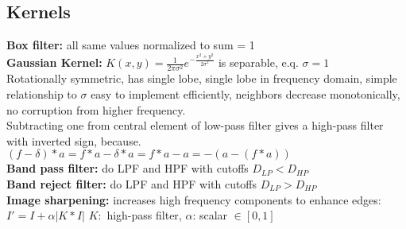 \subsection*{Kernels}
\textbf{Box filter:} all same values normalized to sum = 1\\
\textbf{Gaussian Kernel:} $K(x, y) = \frac{1}{2\pi \sigma^{2}} e^{-\frac{x^{2} + y^{2}}{2\sigma^{2}}}$ is separable, e.q. $\sigma = 1$\\
Rotationally symmetric, has single lobe, single lobe in frequency domain, simple relationship to $\sigma$ easy to implement efficiently, neighbors decrease monotonically, no corruption from higher frequency. \\
Subtracting one from central element of low-pass filter gives a high-pass filter with inverted sign, because.\\
$(f - \delta) * a = f * a - \delta * a = f * a - a = - (a - (f * a))$\\
\textbf{Band pass filter:} do LPF and HPF with cutoffs $D_{LP} < D_{HP}$\\
\textbf{Band reject filter:} do LPF and HPF with cutoffs $D_{LP} > D_{HP}$\\
\textbf{Image sharpening:} increases high frequency components to enhance edges: $I' = I + \alpha |K * I|$ $K:$ high-pass filter, $\alpha$: scalar $\in [0, 1]$\\